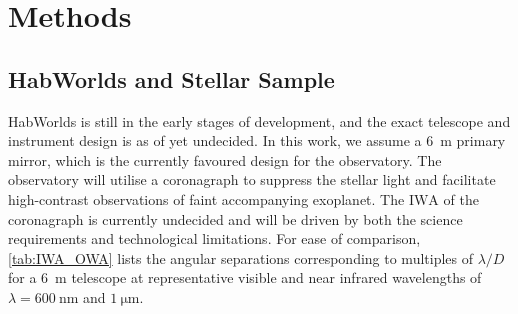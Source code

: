 \documentclass[
    usenatbib,
]{mnras}
\newcommand{\IWA}{\ensuremath{\mathrm{IWA}}}
\newcommand{\hwo}{HabWorlds}
\begin{document}

\section{Methods}


\subsection{\hwo{} and Stellar Sample}
\hwo{} is still in the early stages of development, and the exact telescope and instrument design is as of yet undecided. 
%
In this work, we assume a \SI{6}{\meter} primary mirror, which is the currently favoured design for the observatory.
%
The observatory will utilise a coronagraph to suppress the stellar light and facilitate high-contrast observations of faint accompanying exoplanet. 
%
The \IWA{} of the coronagraph is currently undecided and will be driven by both the science requirements and technological limitations. 
For ease of comparison, \cref{tab:IWA_OWA} lists the angular separations corresponding to multiples of $\lambda / D$ for a \SI{6}{\meter} telescope at representative visible and near infrared wavelengths of $\lambda = \SI{600}{\nano\meter}$ and $\SI{1}{\micro\meter}$.
 
\end{document}
